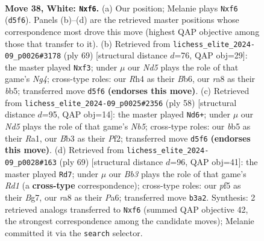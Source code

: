 \documentclass[11pt]{article}
\begin{document}
\clearpage

\begin{figure}[p]\centering
\begin{subfigure}{0.46\textwidth}\centering
\resizebox{\linewidth}{!}{%
\newchessgame
\chessboard[
  setfen={r3r3/1kP5/p4n2/1b1N1p2/7R/1B2P3/1P4P1/R2KN3 w - - 0 38},
  showmover=false,
  pgfstyle=straightmove, color=movearrow, markmove={d5-f6}
]}
\caption{}
\end{subfigure}\hfill
\begin{subfigure}{0.46\textwidth}\centering
\resizebox{\linewidth}{!}{%
\newchessgame
\chessboard[
  setfen={3r3k/7p/1b6/1B1p2n1/5r2/5N2/PP4PP/3RRK2 b - - 0 35},
  showmover=false,
  pgfstyle=straightmove, color=movearrow, markmove={g5-f3}
]}
\caption{}
\end{subfigure}
\\[4pt]
\begin{subfigure}{0.46\textwidth}\centering
\resizebox{\linewidth}{!}{%
\newchessgame
\chessboard[
  setfen={2kr2r1/1p1n1p2/p7/1Nb2B2/2Pp1B2/8/5PPP/R5K1 w - - 3 30},
  showmover=false,
  pgfstyle=straightmove, color=movearrow, markmove={b5-d6}
]}
\caption{}
\end{subfigure}\hfill
\begin{subfigure}{0.46\textwidth}\centering
\resizebox{\linewidth}{!}{%
\newchessgame
\chessboard[
  setfen={3r2k1/6b1/p5pn/1pB1p3/1P1pN1P1/r4PK1/8/3R3R b - - 0 35},
  showmover=false,
  pgfstyle=straightmove, color=movearrow, markmove={d8-d7}
]}
\caption{}
\end{subfigure}
\caption{\textbf{Move 38, White: \texttt{Nxf6}.} (a) Our position; Melanie plays \texttt{Nxf6} (\texttt{d5f6}). Panels (b)--(d) are the retrieved master positions whose correspondence most drove this move (highest QAP objective among those that transfer to it). (b) Retrieved from \texttt{lichess\_elite\_2024-09\_p0026\#3178} (ply 69) [structural distance $d$=76, QAP obj=29]: the master played \texttt{Nxf3}; under $\mu$ our \emph{Nd5} plays the role of that game's \emph{Ng4}; cross-type roles: our \emph{R}h4 as their \emph{B}b6, our \emph{r}a8 as their \emph{b}b5; transferred move \texttt{d5f6} \textbf{(endorses this move)}. (c) Retrieved from \texttt{lichess\_elite\_2024-09\_p0025\#2356} (ply 58) [structural distance $d$=95, QAP obj=14]: the master played \texttt{Nd6+}; under $\mu$ our \emph{Nd5} plays the role of that game's \emph{Nb5}; cross-type roles: our \emph{b}b5 as their \emph{R}a1, our \emph{B}b3 as their \emph{P}f2; transferred move \texttt{d5f6} \textbf{(endorses this move)}. (d) Retrieved from \texttt{lichess\_elite\_2024-09\_p0028\#163} (ply 69) [structural distance $d$=96, QAP obj=41]: the master played \texttt{Rd7}; under $\mu$ our \emph{Bb3} plays the role of that game's \emph{Rd1} (a \textbf{cross-type} correspondence); cross-type roles: our \emph{p}f5 as their \emph{B}g7, our \emph{r}a8 as their \emph{P}a6; transferred move \texttt{b3a2}. Synthesis: 2 retrieved analogs transferred to \texttt{Nxf6} (summed QAP objective 42, the strongest correspondence among the candidate moves); Melanie committed it via the \texttt{search} selector.}
\label{fig:thought-m74}
\end{figure}
\end{document}
